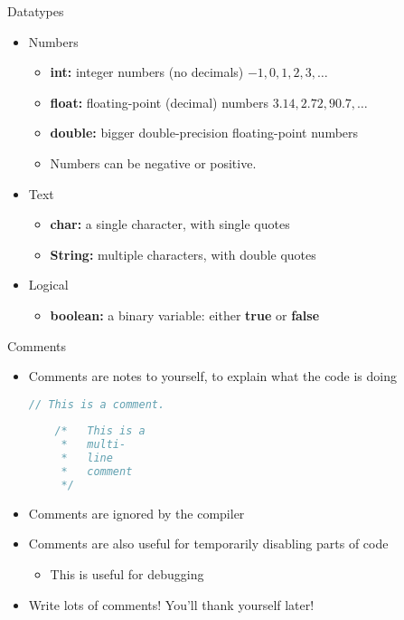 \documentclass[pdf]{beamer}
\begin{document}
\begin{frame}{Datatypes}
\begin{itemize}
\item Numbers
    \begin{itemize}
        \item \textbf{int:} integer numbers (no decimals) $-1, 0, 1, 2, 3, \ldots$
        \item \textbf{float:} floating-point (decimal) numbers $3.14, 2.72, 90.7, \ldots$
        \item \textbf{double:} bigger double-precision floating-point numbers
        \item Numbers can be negative or positive.
    \end{itemize}
\item Text
    \begin{itemize}
        \item \textbf{char:} a single character, with single quotes 
        \item \textbf{String:} multiple characters, with double quotes
    \end{itemize}
\item Logical
    \begin{itemize}
        \item \textbf{boolean:} a binary variable: either \textbf{true} or \textbf{false}
    \end{itemize}
\end{itemize}
\end{frame}


\begin{frame}[fragile]{Comments}
\begin{itemize}
\item Comments are notes to yourself, to explain what the code is doing
\begin{lstlisting}[language=Java]
    // This is a comment.
    
    /*   This is a 
     *   multi-
     *   line
     *   comment
     */
\end{lstlisting}
\item Comments are ignored by the compiler
\item Comments are also useful for temporarily disabling parts of code
    \begin{itemize}
        \item This is useful for debugging
    \end{itemize}
\item Write lots of comments! You'll thank yourself later!
\end{itemize}
\end{frame}
\end{document}

